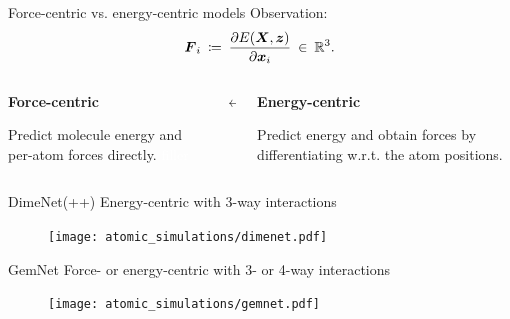 \begin{frame}{Force-centric vs. energy-centric models}
    Observation: 
    \[
        \boldsymbol{F}_i \: \coloneqq \: \frac{\partial E(\boldsymbol{X}, \boldsymbol{z})}{\partial \boldsymbol{x}_i} \: \in \: \mathbb{R}^3.
    \]
    \begin{columns}
        \centering
        \begin{column}{0.35\textwidth}
           \begin{center}
                \textbf{Force-centric}
           \end{center}
           Predict molecule energy and per-atom forces directly. \textcolor{white}{filler}
        \end{column}
        \begin{column}{0.15\textwidth}
            \begin{center}
                $\boldsymbol{\leftrightarrow}$
            \end{center}
        \end{column}
        \begin{column}{0.35\textwidth}
            \begin{center}
                \textbf{Energy-centric}
            \end{center}
            Predict energy and obtain forces by differentiating w.r.t. 
            the atom positions.
        \end{column}
    \end{columns}
\end{frame}

\begin{frame}{DimeNet(++) }
    \centering
    Energy-centric with 3-way interactions
    \begin{figure}[H]
        \vspace*{-1em}
        \texttt{[image: atomic\_simulations/dimenet.pdf]}
    \end{figure}
\end{frame}

\begin{frame}{GemNet }
    \centering
    Force- or energy-centric with 3- or 4-way interactions
    \begin{figure}[H]
        \vspace*{-1em}
        \texttt{[image: atomic\_simulations/gemnet.pdf]}
    \end{figure}
\end{frame}

